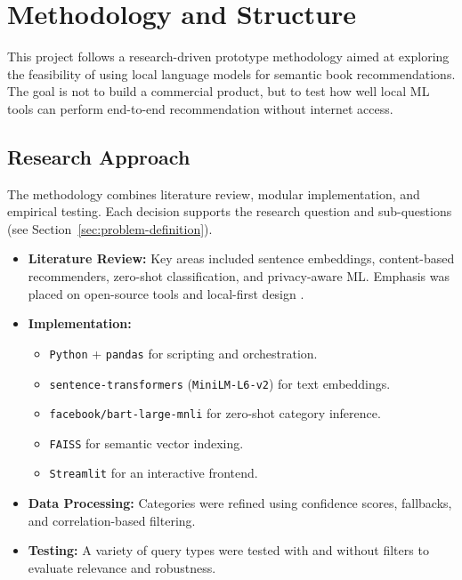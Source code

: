 \chapter{Methodology and Structure}
\label{chapter:methodology}

This project follows a research-driven prototype methodology aimed at exploring the feasibility of using local language models for semantic book recommendations. The goal is not to build a commercial product, but to test how well local ML tools can perform end-to-end recommendation without internet access.

\section{Research Approach}
\label{sec:research-approach}

The methodology combines literature review, modular implementation, and empirical testing. Each decision supports the research question and sub-questions (see Section~\ref{sec:problem-definition}).

\begin{itemize}
    \item \textbf{Literature Review:} Key areas included sentence embeddings, content-based recommenders, zero-shot classification, and privacy-aware ML. Emphasis was placed on open-source tools and local-first design \cite{handson-ml}.
    
    \item \textbf{Implementation:}
    \begin{itemize}
        \item \texttt{Python} + \texttt{pandas} for scripting and orchestration.
        \item \texttt{sentence-transformers} (\texttt{MiniLM-L6-v2}) for text embeddings.
        \item \texttt{facebook/bart-large-mnli} for zero-shot category inference.
        \item \texttt{FAISS} for semantic vector indexing.
        \item \texttt{Streamlit} for an interactive frontend.
    \end{itemize}

    \item \textbf{Data Processing:} Categories were refined using confidence scores, fallbacks, and correlation-based filtering.
    
    \item \textbf{Testing:} A variety of query types were tested with and without filters to evaluate relevance and robustness.
\end{itemize}

